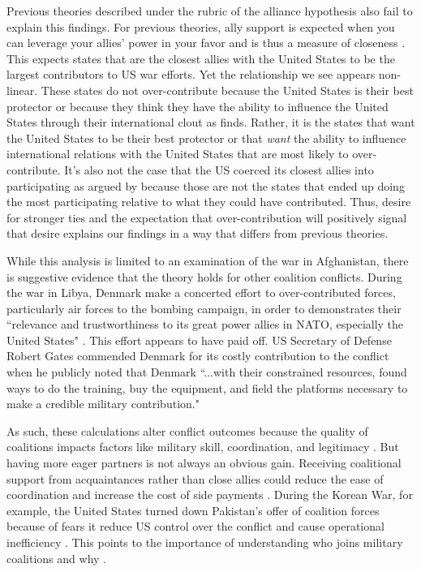 \documentclass[12pt,letterpaper]{article}
\begin{document}
	Previous theories described under the rubric of the alliance hypothesis also fail to explain this findings. For previous theories, ally support is expected when you can leverage your allies' power in your favor and is thus a measure of closeness \citep{davidson_neoclassicalrealistexplanation_2011}. This expects states that are the closest allies with the United States to be the largest contributors to US war efforts. Yet the relationship we see appears non-linear. These states do not over-contribute because the United States is their best protector or because they think they have the ability to influence the United States through their international clout as \citet{ringsmose_natoburdensharingredux_2010} finds. Rather, it is the states that want the United States to be their best protector or that \textit{want} the ability to influence international relations with the United States that are most likely to over-contribute. It's also not the case that the US coerced its closest allies into participating as argued by \citet{kupchan_natopersiangulf_1988} because those are not the states that ended up doing the most participating relative to what they could have contributed. Thus, desire for stronger ties and the expectation that over-contribution will positively signal that desire explains our findings in a way that differs from previous theories.

	While this analysis is limited to an examination of the war in Afghanistan, there is suggestive evidence that the theory holds for other coalition conflicts. During the war in Libya, Denmark make a concerted effort to over-contributed forces, particularly air forces to the bombing campaign, in order to demonstrates their ``relevance and trustworthiness to its great power allies in NATO, especially the United States" \citep{jakobsen_prestigeseekingsmallstates_2018, dicke_natoburdensharinglibya_2013}. This effort appears to have paid off. US Secretary of Defense Robert Gates commended Denmark for its costly contribution to the conflict when he publicly noted that Denmark ``...with their constrained resources, found ways to do the training, buy the equipment, and field the platforms necessary to make a credible military contribution."
	
	As such, these calculations alter conflict outcomes because the quality of coalitions impacts factors like military skill, coordination, and legitimacy \citep{auerswald_natoafghanistanfighting_2014, saideman_ambivalentcoalitiondoing_2016, cranmer_coalitionqualitymultinational_2017}. But having more eager partners is not always an obvious gain. Receiving coalitional support from acquaintances rather than close allies could reduce the ease of coordination and increase the cost of side payments \citep{papayoanou_intraalliancebargainingbosnia_1997, morrow_alliancesasymmetryalternative_1991, wolford_politicsmilitarycoalitions_2015}. During the Korean War, for example, the United States turned down Pakistan's offer of coalition forces because of fears it reduce US control over the conflict and cause operational inefficiency \citep{stueck_koreanwarinternational_1997}. This points to the importance of understanding who joins military coalitions and why \citep{wolford_politicsmilitarycoalitions_2015}. 
\end{document}
